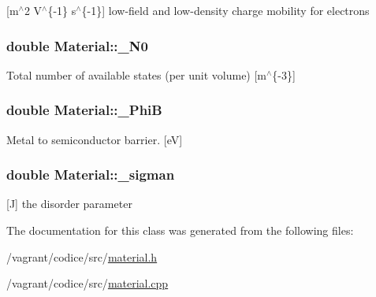 \mbox{[}m$^\wedge$2 V$^\wedge$\{-\/1\} s$^\wedge$\{-\/1\}\mbox{]} low-\/field and low-\/density charge mobility for electrons \hypertarget{classMaterial_a6451fdaa6afaa52aec832b79fe9adb79}{
\subsubsection[{\-\_\-\-N0}]{\setlength{\rightskip}{0pt plus 5cm}double Material\-::\-\_\-\-N0\hspace{0.3cm}{\ttfamily [protected]}}}\label{classMaterial_a6451fdaa6afaa52aec832b79fe9adb79}
Total number of available states (per unit volume) \mbox{[}m$^\wedge$\{-\/3\}\mbox{]} \hypertarget{classMaterial_a8f0ce4108c5a396ab1db33789e24b61c}{
\subsubsection[{\-\_\-\-Phi\-B}]{\setlength{\rightskip}{0pt plus 5cm}double Material\-::\-\_\-\-Phi\-B\hspace{0.3cm}{\ttfamily [protected]}}}\label{classMaterial_a8f0ce4108c5a396ab1db33789e24b61c}
Metal to semiconductor barrier. \mbox{[}e\-V\mbox{]} \hypertarget{classMaterial_acdc3ca25ac421ca653ee4207491a8897}{
\subsubsection[{\-\_\-sigman}]{\setlength{\rightskip}{0pt plus 5cm}double Material\-::\-\_\-sigman\hspace{0.3cm}{\ttfamily [protected]}}}\label{classMaterial_acdc3ca25ac421ca653ee4207491a8897}
\mbox{[}J\mbox{]} the disorder parameter 

The documentation for this class was generated from the following files\-:\begin{DoxyCompactItemize}
\item 
/vagrant/codice/src/\hyperlink{material_8h}{material.\-h}\item 
/vagrant/codice/src/\hyperlink{material_8cpp}{material.\-cpp}\end{DoxyCompactItemize}
